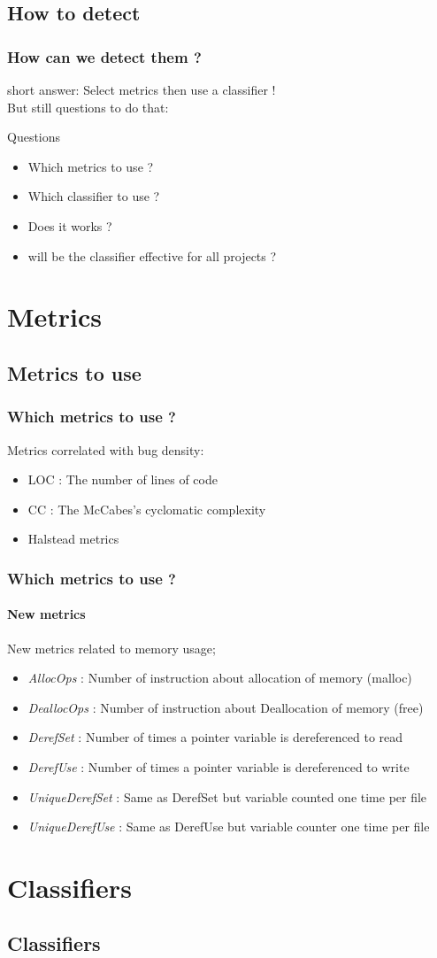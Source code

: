 \documentclass{beamer}
\begin{document}
\subsection{How to detect}
\begin{frame}
 \frametitle{How can we detect them ?}
 short answer: \alert{Select metrics then use a classifier !}\\
 But still questions to do that:\\
 \begin{block}{Questions}
  \begin{itemize}
   \item Which metrics to use ?
   \item Which classifier to use ?
   \item Does it works ?
   \item will be the classifier effective for all projects ?
  \end{itemize}
 \end{block}
\end{frame}

\section{Metrics}
\subsection{Metrics to use}
\begin{frame}
 \frametitle{Which metrics to use ?}
 Metrics correlated with bug density:
 \begin{itemize}
  \item LOC : The number of lines of code
  \item CC  : The McCabes's cyclomatic complexity
  \item Halstead metrics %
 \end{itemize}
\end{frame}

\begin{frame}
 \frametitle{Which metrics to use ?}
 \framesubtitle{New metrics} %
 New metrics related to memory usage;
 \begin{itemize}
  \item \emph{AllocOps} : Number of instruction about allocation of memory (malloc)
  \item \emph{DeallocOps} : Number of instruction about Deallocation of memory (free)
  \item \emph{DerefSet} : Number of times a pointer variable is dereferenced to read%
  \item \emph{DerefUse} : Number of times a pointer variable is dereferenced to write
  \item \emph{UniqueDerefSet} : Same as DerefSet but variable counted one time per file
  \item \emph{UniqueDerefUse} : Same as DerefUse but variable counter one time per file
 \end{itemize}
\end{frame}

\section{Classifiers}
\subsection{Classifiers}
\end{document}
